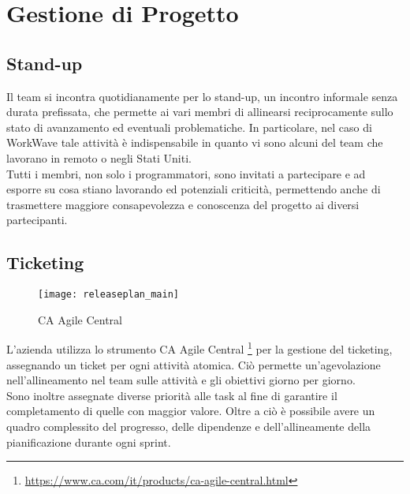 \section{Gestione di Progetto}

\subsection{Stand-up}

Il team si incontra quotidianamente per lo stand-up, un incontro informale senza durata prefissata, che permette ai vari membri di allinearsi reciprocamente sullo stato di avanzamento ed eventuali problematiche. In particolare, nel caso di WorkWave tale attività è indispensabile in quanto vi sono alcuni del team che lavorano in remoto o negli Stati Uniti. \\

Tutti i membri, non solo i programmatori, sono invitati a partecipare e ad esporre su cosa stiano lavorando ed potenziali criticità, permettendo anche di trasmettere maggiore consapevolezza e conoscenza del progetto ai diversi partecipanti.

\subsection{Ticketing}

\begin{figure}[H] 
  \centering 
  \texttt{[image: releaseplan\_main]} 
  \caption{CA Agile Central}
\end{figure}

L'azienda utilizza lo strumento CA Agile Central \footnote{ \url{https://www.ca.com/it/products/ca-agile-central.html}} per la gestione del ticketing, assegnando un ticket per ogni attività atomica. Ciò permette un'agevolazione nell'allineamento nel team sulle attività e gli obiettivi giorno per giorno. \\

Sono inoltre assegnate diverse priorità alle task al fine di garantire il completamento di quelle con maggior valore. Oltre a ciò è possibile avere un quadro complessito del progresso, delle dipendenze e dell'allineamente della pianificazione durante ogni \gls{sprint}.

